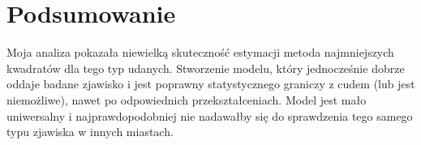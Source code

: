 \section{Podsumowanie}\label{sec:podsumowanie}

Moja analiza pokazała niewielką skuteczność estymacji metoda najmniejszych kwadratów dla tego typ udanych.
Stworzenie modelu, który jednocześnie dobrze oddaje badane zjawisko i jest poprawny statystycznego graniczy z cudem (lub jest niemożliwe), nawet po odpowiednich przekształceniach.
Model jest mało uniwersalny i najprawdopodobniej nie nadawałby się do sprawdzenia tego samego typu zjawiska w innych miastach.
